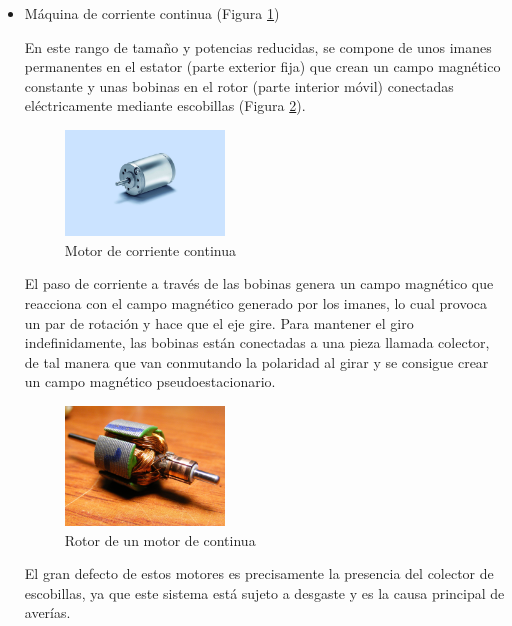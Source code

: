 \documentclass[12pt,twoside]{article}
\begin{document}
		\begin{itemize}
			\item Máquina de corriente continua (Figura \ref{fig:motor_continua})
			
			En este rango de tamaño y potencias reducidas, se compone de unos imanes permanentes en el estator (parte exterior fija) que crean un campo magnético constante y unas bobinas en el rotor (parte interior móvil) conectadas eléctricamente mediante escobillas (Figura \ref{fig:bobinas_continua}).
			\begin{figure}
			\centering
			\includegraphics[width=0.4\textwidth]{Imatges/Funcionament/motor_continua.png}
			\caption{Motor de corriente continua}
			\label{fig:motor_continua}
		\end{figure}

El paso de corriente a través de las bobinas genera un campo magnético que reacciona con el campo magnético generado por los imanes, lo cual provoca un par de 	rotación y hace que el eje gire. Para mantener el giro indefinidamente, las bobinas 	están conectadas a una pieza llamada colector, de tal manera que van conmutando la 	polaridad al girar y se consigue crear un campo magnético pseudoestacionario.

			\begin{figure}
			\centering
			\includegraphics[width=0.4\textwidth]{Imatges/Funcionament/bobinas_motor_continua.png}
			\caption{Rotor de un motor de continua}
			\label{fig:bobinas_continua}
		\end{figure}
El gran defecto de estos motores es precisamente la presencia del colector de 	escobillas, ya que este sistema está sujeto a desgaste y es la causa principal de averías.


\end{itemize}
\end{document}
